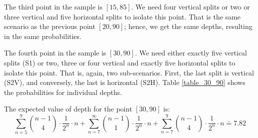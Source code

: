 The third point in the sample is $[15,85]$. We need four vertical splits or two or three vertical and five horizontal splits to isolate this point. That is the same scenario as the previous point $[20,90]$; hence, we get the same depths, resulting in the same probabilities.

The fourth point in the sample is $[30,90]$. We need either exactly five vertical splits (S1) or two, three or four vertical and exactly five horizontal splits to isolate this point. That is, again, two sub-scenarios. First, the last split is vertical (S2V), and conversely, the last is horizontal (S2H).
Table \ref{table_30_90} shows the probabilities for individual depths.



The expected value of depth for the point $[30,90]$ is:
$$\sum_{n=5}^{9}\binom{n-1}{4}\cdot \frac{1}{2^n}\cdot n + \sum_{n=7}^{\infty}\binom{n-1}{1}\cdot \frac{1}{2^n}\cdot n + \sum_{n=7}^{9}\binom{n-1}{4}\cdot \frac{1}{2^n}\cdot n \doteq 7.82$$



